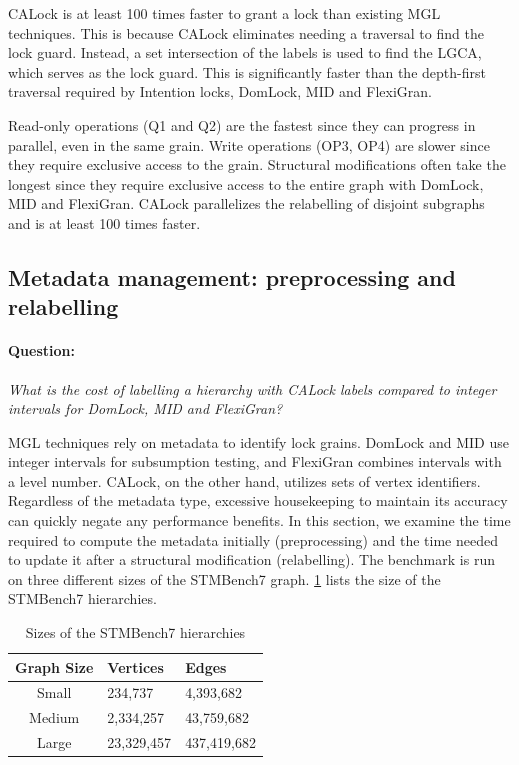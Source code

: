 CALock is at least 100 times faster to grant a lock than existing MGL techniques. This is because CALock eliminates needing a traversal to find the lock guard. Instead, a set intersection of the labels is used to find the LGCA, which serves as the lock guard. This is significantly faster than the depth-first traversal required by Intention locks, DomLock, MID and FlexiGran.

Read-only operations (Q1 and Q2) are the fastest since they can progress in parallel, even in the same grain. 
Write operations (OP3, OP4) are slower since they require exclusive access to the grain. Structural modifications often take the longest since they require exclusive access to the entire graph with DomLock, MID and FlexiGran. CALock parallelizes the relabelling of disjoint subgraphs and is at least 100 times faster. 



\subsection{Metadata management: preprocessing and relabelling} \label
{benchmark:labellingAndRelabelling}
 
\paragraph{Question:} \emph{What is the cost of labelling a hierarchy with CALock labels compared to integer intervals for DomLock, MID and FlexiGran?}

MGL techniques rely on metadata to identify lock grains. DomLock and MID use integer intervals for subsumption testing, and FlexiGran combines intervals with a level number. CALock, on the other hand, utilizes sets of vertex identifiers. Regardless of the metadata type, excessive housekeeping to maintain its accuracy can quickly negate any performance benefits. In this section, we examine the time required to compute the metadata initially (preprocessing) and the time needed to update it after a structural modification (relabelling). The benchmark is run on three different sizes of the STMBench7 graph. \cref{tab:graphSizes} lists the size of the STMBench7 hierarchies.

\begin{table}[h]
	\centering
	\captionsetup{justification=centering}
	\begin{tabular}{c|ll}
		\textbf{Graph Size} & \textbf{Vertices} & \textbf{Edges} \\ \hline
		Small  & 234,737 	& 4,393,682 	\\
		Medium & 2,334,257 	& 43,759,682	\\
		Large  & 23,329,457 & 437,419,682 	\\
	\end{tabular}
	\caption{Sizes of the STMBench7 hierarchies}
	\label{tab:graphSizes}
\end{table}


